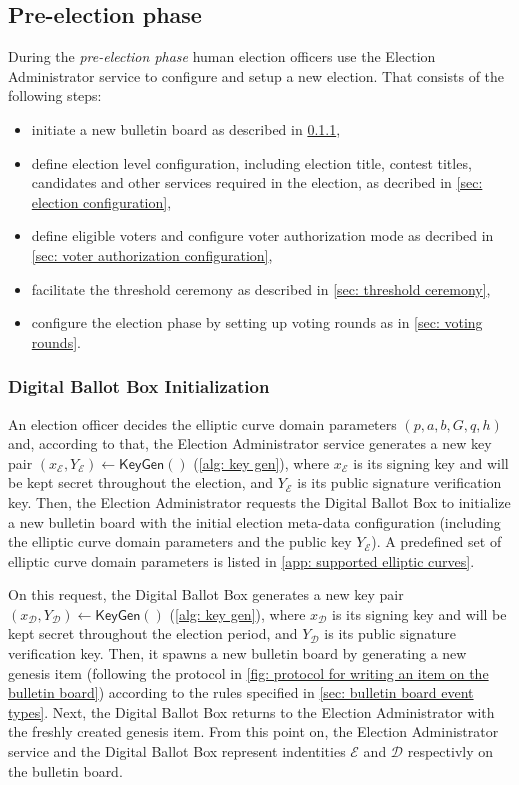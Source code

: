 \subsection{Pre-election phase} \label{sec: pre-election phase}
During the \textit{pre-election phase} human election officers use the Election Administrator service to configure and setup a new election. That consists of the following steps:
\begin{itemize}
    \item initiate a new bulletin board as described in \cref{sec: digital ballot box initialization},
    \item define election level configuration, including election title, contest titles, candidates and other services required in the election, as decribed in \cref{sec: election configuration},
    \item define eligible voters and configure voter authorization mode as decribed in \cref{sec: voter authorization configuration},
    \item facilitate the threshold ceremony as described in \cref{sec: threshold ceremony},
    \item configure the election phase by setting up voting rounds as in \cref{sec: voting rounds}.
\end{itemize}


\subsubsection{Digital Ballot Box Initialization} \label{sec: digital ballot box initialization}
An election officer decides the elliptic curve domain parameters $(p, a, b, G, q, h)$ and, according to that, the Election Administrator service generates a new key pair $(x_\mathcal{E}, Y_\mathcal{E}) \gets \mathsf{KeyGen}()$ (\cref{alg: key gen}), where $x_\mathcal{E}$ is its signing key and will be kept secret throughout the election, and $Y_\mathcal{E}$ is its public signature verification key. Then, the Election Administrator requests the Digital Ballot Box to initialize a new bulletin board with the initial election meta-data configuration (including the elliptic curve domain parameters and the public key $Y_\mathcal{E}$). A predefined set of elliptic curve domain parameters is listed in \cref{app: supported elliptic curves}.

On this request, the Digital Ballot Box generates a new key pair $(x_\mathcal{D}, Y_\mathcal{D}) \gets \mathsf{KeyGen}()$ (\cref{alg: key gen}), where $x_\mathcal{D}$ is its signing key and will be kept secret throughout the election period, and $Y_\mathcal{D}$ is its public signature verification key. Then, it spawns a new bulletin board by generating a new genesis item (following the protocol in \cref{fig: protocol for writing an item on the bulletin board}) according to the rules specified in \cref{sec: bulletin board event types}. Next, the Digital Ballot Box returns to the Election Administrator with the freshly created genesis item. From this point on, the Election Administrator service and the Digital Ballot Box represent indentities $\mathcal{E}$ and $\mathcal{D}$ respectivly on the bulletin board.


